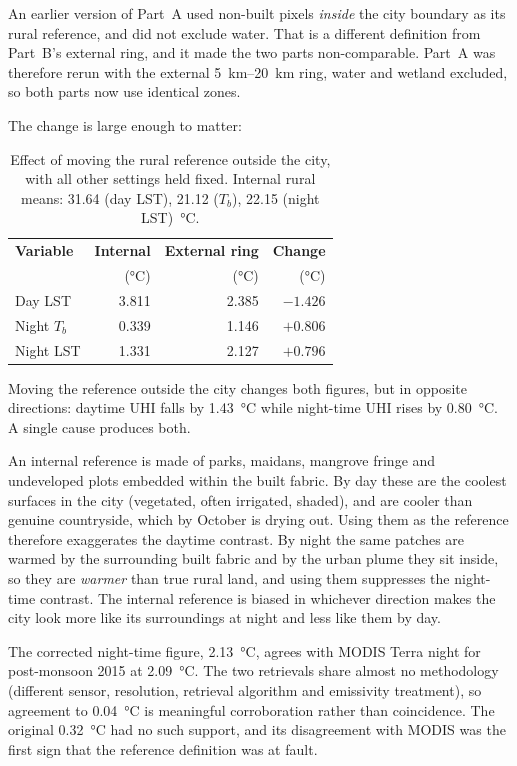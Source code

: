 \documentclass[11pt,a4paper]{article}
\begin{document}
An earlier version of Part~A used non-built pixels \emph{inside} the
city boundary as its rural reference, and did not exclude water. That
is a different definition from Part~B's external ring, and it made the
two parts non-comparable. Part~A was therefore rerun with the external
\SIrange{5}{20}{\kilo\metre} ring, water and wetland excluded, so both
parts now use identical zones.

The change is large enough to matter:

\begin{table}[htbp]
\centering
\begin{tabular}{lrrr}
\toprule
\textbf{Variable} & \textbf{Internal} & \textbf{External ring} &
\textbf{Change} \\
 & (\si{\degreeCelsius}) & (\si{\degreeCelsius}) &
(\si{\degreeCelsius}) \\
\midrule
Day LST       & 3.811 & 2.385 & $-1.426$ \\
Night $T_b$     & 0.339 & 1.146 & $+0.806$ \\
Night LST     & 1.331 & 2.127 & $+0.796$ \\
\bottomrule
\end{tabular}
\caption{Effect of moving the rural reference outside the city, with
all other settings held fixed. Internal rural means: 31.64
(day LST), 21.12 ($T_b$), 22.15 (night LST)~\si{\degreeCelsius}.}
\label{tab:refdef}
\end{table}

Moving
the reference outside the city changes both figures, but in opposite
directions: daytime UHI falls by \SI{1.43}{\degreeCelsius} while
night-time UHI rises by \SI{0.80}{\degreeCelsius}. A single cause
produces both.

An internal reference is made of parks, maidans, mangrove fringe and
undeveloped plots embedded within the built fabric. By day these are
the coolest surfaces in the city (vegetated, often irrigated,
shaded), and are cooler than genuine countryside, which by October
is drying out. Using them as the reference therefore exaggerates the
daytime contrast. By night the same patches are warmed by the
surrounding built fabric and by the urban plume they sit inside, so
they are \emph{warmer} than true rural land, and using them suppresses
the night-time contrast. The internal reference is biased in whichever
direction makes the city look more like its surroundings at night and
less like them by day.

The corrected night-time figure, \SI{2.13}{\degreeCelsius}, agrees
with MODIS Terra night for post-monsoon 2015 at
\SI{2.09}{\degreeCelsius}. The two retrievals share almost no
methodology (different sensor, resolution, retrieval algorithm and
emissivity treatment), so agreement to
\SI{0.04}{\degreeCelsius} is meaningful corroboration rather than
coincidence. The original \SI{0.32}{\degreeCelsius} had no such
support, and its disagreement with MODIS was the first sign that the
reference definition was at fault.
\end{document}
